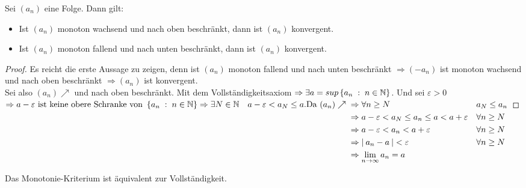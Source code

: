 \documentclass[a4paper,titlepage,oneside]{article}
\def\N{\ensuremath{\mathbb{N}} }
\renewcommand{\epsilon}{\ensuremath{\varepsilon} }
\def\sp{\hspace{0,1cm}}
\renewcommand{\liminf}[2][n]{\ensuremath{\lim\limits_{#1 \rightarrow \infty}{#2}}}
\newcommand{\abs}[1]{\ensuremath{\left|\:#1\:\right|}}
\newcommand{\menge}[2]{\ensuremath{\left\{#1\sp : \sp #2\right\}}}
\theoremstyle{thmstyle}
\begin{document}
\begin{subsatz}[Monotoniekriterium]
Sei $(a_n)$ eine Folge. Dann gilt:
\begin{itemize}
\item Ist $(a_n)$ monoton wachsend und nach oben beschränkt, dann ist $(a_n)$ konvergent.
\item Ist $(a_n)$ monoton fallend  und nach unten beschränkt, dann ist $(a_n)$ konvergent.
\end{itemize}
\begin{proof}
Es reicht die erste Aussage zu zeigen, denn ist $(a_n)$ monoton fallend und nach unten beschränkt \( \Rightarrow (-a_n)\) ist monoton wachsend und nach oben beschränkt $\Rightarrow (a_n) $ ist konvergent.\\
Sei also \((a_n) \nearrow \) und nach oben beschränkt. Mit dem Vollständigkeitsaxiom \(\Rightarrow \exists a = sup\menge{a_n}{n \in \N}\). Und sei $\epsilon > 0$
\begin{math}
\Rightarrow a - \epsilon \text{ ist keine obere Schranke von } \menge{a_n}{n \in \N} \Rightarrow \exists N \in \N \quad a-\epsilon < a_N \le a.\\
\text{Da }(a_n) \nearrow \begin{aligned}[t]
					&\Rightarrow \forall n \ge N 						&& a_N \le a_n \\
					&\Rightarrow a-\epsilon < a_N \le a_n \le a < a+\epsilon 	&& \forall n \ge N \\
					&\Rightarrow a-\epsilon < a_n < a+\epsilon 			&& \forall n \ge N \\
					&\Rightarrow \abs{a_n - a} < \epsilon					&& \forall n \ge N \\
					&\Rightarrow \liminf{a_n} = a \end{aligned}\end{math}
\end{proof}
\end{subsatz}

\begin{subbem}
Das Monotonie-Kriterium ist äquivalent zur Vollständigkeit.
\end{subbem}
\end{document}
